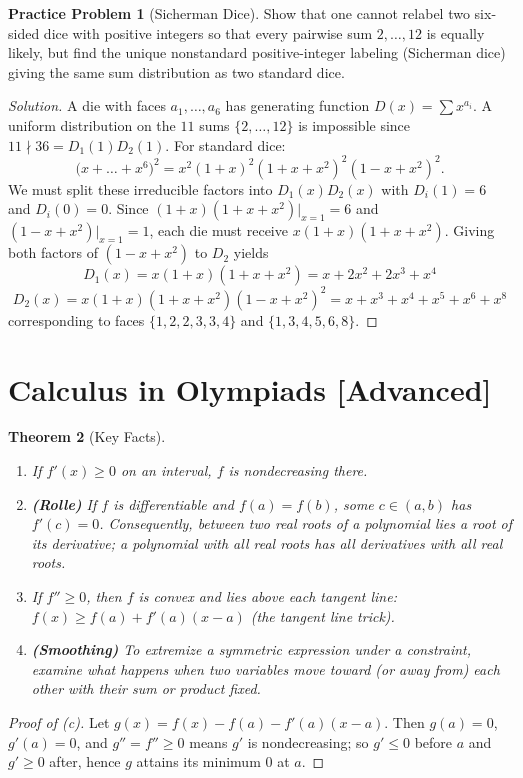 \documentclass[11pt]{article}
\theoremstyle{plain}
\newtheorem{theorem}{Theorem}[section]
\theoremstyle{definition}
\newtheorem{problem}[theorem]{Practice Problem}
\newenvironment{solution}{\begin{proof}[Solution]}{\end{proof}}
\begin{document}
\begin{problem}[Sicherman Dice]
Show that one cannot relabel two six-sided dice with positive integers so that
every pairwise sum $2,\dots,12$ is equally likely, but find the unique nonstandard positive-integer labeling (Sicherman dice) giving the same sum distribution as two standard dice.
\end{problem}
\begin{solution}
A die with faces $a_1,\dots,a_6$ has generating function $D(x)=\sum x^{a_i}$. A uniform distribution on the $11$ sums $\{2,\dots,12\}$ is impossible since $11 \nmid 36 = D_1(1)D_2(1)$. For standard dice:
\[
\bigl(x + \dots + x^6\bigr)^2 = x^2(1+x)^2(1+x+x^2)^2(1-x+x^2)^2.
\]
We must split these irreducible factors into $D_1(x)D_2(x)$ with $D_i(1)=6$ and $D_i(0)=0$. Since $(1+x)(1+x+x^2)\big|_{x=1}=6$ and $(1-x+x^2)\big|_{x=1}=1$, each die must receive $x(1+x)(1+x+x^2)$. Giving both factors of $(1-x+x^2)$ to $D_2$ yields
$$D_1(x) = x(1+x)(1+x+x^2) = x+2x^2+2x^3+x^4$$
$$D_2(x) = x(1+x)(1+x+x^2)(1-x+x^2)^2 = x+x^3+x^4+x^5+x^6+x^8$$
corresponding to faces $\{1,2,2,3,3,4\}$ and $\{1,3,4,5,6,8\}$.
\end{solution}

\section{Calculus in Olympiads [Advanced]}

\begin{theorem}[Key Facts]
\leavevmode
\begin{enumerate}[label=(\alph*)]
\item If $f'(x) \ge 0$ on an interval, $f$ is nondecreasing there.
\item \textbf{(Rolle)} If $f$ is differentiable and $f(a)=f(b)$, some $c\in(a,b)$ has
$f'(c)=0$. Consequently, between two real roots of a polynomial lies a root of
its derivative; a polynomial with all real roots has all derivatives with all
real roots.
\item If $f''\ge 0$, then $f$ is convex and lies above each tangent line:
$f(x) \ge f(a) + f'(a)(x-a)$ (the \emph{tangent line trick}).
\item \textbf{(Smoothing)} To extremize a symmetric expression under a constraint,
examine what happens when two variables move toward (or away from) each other
with their sum or product fixed.
\end{enumerate}
\end{theorem}
\begin{proof}[Proof of (c)]
Let $g(x) = f(x)-f(a)-f'(a)(x-a)$. Then $g(a)=0$, $g'(a)=0$, and $g''=f''\ge0$
means $g'$ is nondecreasing; so $g' \le 0$ before $a$ and $g'\ge 0$ after,
hence $g$ attains its minimum $0$ at $a$.
\end{proof}
\end{document}
